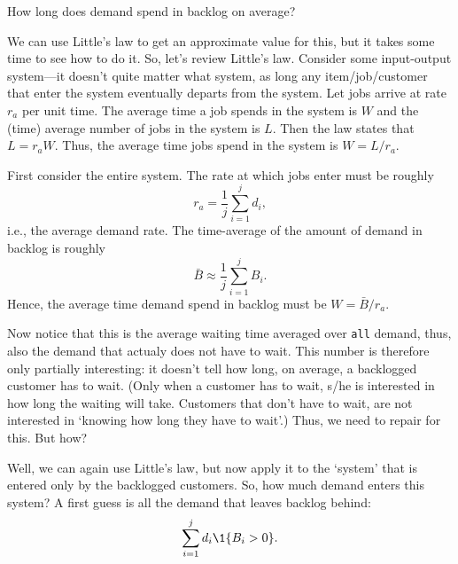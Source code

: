 \begin{question}
  How long does demand spend in backlog on average?
\end{question}

  \begin{solution}
    We can use Little's law to get an approximate value for this, but
    it takes some time to see how to do it. So, let's review Little's
    law. Consider some input-output system---it doesn't quite matter
    what system, as long any item/job/customer that enter the system
    eventually departs from the system.  Let jobs arrive at rate $r_a$
    per unit time. The average time a job spends in the system is $W$
    and the (time) average number of jobs in the system is $L$. Then
    the law states that $L = r_a W$.  Thus, the average time jobs
    spend in the system is $W = L/r_a$.

    First consider the entire system. The rate at which jobs enter must be roughly 
    \begin{equation*}
      r_a = \frac 1 j \sum_{i=1}^j d_i,
    \end{equation*}
    i.e., the average demand rate. The time-average of the amount of
    demand in backlog is roughly
    \begin{equation*}
    \bar B \approx \frac 1 j \sum_{i=1}^j B_i.
    \end{equation*}
    Hence, the average time demand spend in backlog must be
    $W =  \bar B /r_a$.

    Now notice that this is the average waiting time averaged over
    \texttt{all} demand, thus, also the demand that actualy does not
    have to wait. This number is therefore only partially interesting:
    it doesn't tell how long, on average, a backlogged customer has to
    wait. (Only when a customer has to wait, s/he is interested in how
    long the waiting will take. Customers that don't have to wait, are
    not interested in `knowing how long they have to wait'.) Thus, we
    need to repair for this. But how? 

    Well, we can again use Little's law, but now apply it to the
    `system' that is entered only by the backlogged customers.  So,
    how much demand enters this system?  A first guess is all the demand that leaves backlog behind:
    \begin{equation*}
      \sum_{i=1}^j d_i \1{B_i > 0}.
    \end{equation*} 
 


\end{solution}

